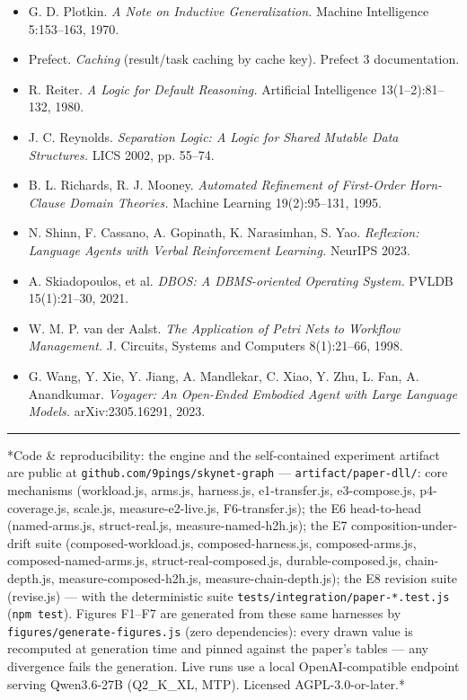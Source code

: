 \documentclass[11pt]{article}
\begin{document}
\begin{itemize}
\item G. D. Plotkin. \emph{A Note on Inductive Generalization.} Machine Intelligence 5:153–163, 1970.
\item Prefect. \emph{Caching} (result/task caching by cache key). Prefect 3 documentation.
\item R. Reiter. \emph{A Logic for Default Reasoning.} Artificial Intelligence 13(1–2):81–132, 1980.
\item J. C. Reynolds. \emph{Separation Logic: A Logic for Shared Mutable Data Structures.} LICS 2002, pp. 55–74.
\item B. L. Richards, R. J. Mooney. \emph{Automated Refinement of First-Order Horn-Clause Domain Theories.} Machine Learning 19(2):95–131, 1995.
\item N. Shinn, F. Cassano, A. Gopinath, K. Narasimhan, S. Yao. \emph{Reflexion: Language Agents with Verbal Reinforcement Learning.} NeurIPS 2023.
\item A. Skiadopoulos, et al. \emph{DBOS: A DBMS-oriented Operating System.} PVLDB 15(1):21–30, 2021.
\item W. M. P. van der Aalst. \emph{The Application of Petri Nets to Workflow Management.} J. Circuits, Systems and Computers 8(1):21–66, 1998.
\item G. Wang, Y. Xie, Y. Jiang, A. Mandlekar, C. Xiao, Y. Zhu, L. Fan, A. Anandkumar. \emph{Voyager: An Open-Ended Embodied Agent with Large Language Models.} arXiv:2305.16291, 2023.
\end{itemize}

\medskip\hrule\medskip

*Code \& reproducibility: the engine and the self-contained experiment artifact are public at \texttt{github.com/\allowbreak{}9pings/\allowbreak{}skynet-graph} — \texttt{artifact/\allowbreak{}paper-dll/\allowbreak{}}: core mechanisms (workload.js, arms.js, harness.js, e1-transfer.js, e3-compose.js, p4-coverage.js, scale.js, measure-e2-live.js, F6-transfer.js); the E6 head-to-head (named-arms.js, struct-real.js, measure-named-h2h.js); the E7 composition-under-drift suite (composed-workload.js, composed-harness.js, composed-arms.js, composed-named-arms.js, struct-real-composed.js, durable-composed.js, chain-depth.js, measure-composed-h2h.js, measure-chain-depth.js); the E8 revision suite (revise.js) — with the deterministic suite \texttt{tests/\allowbreak{}integration/\allowbreak{}paper-*.test.js} (\texttt{npm test}). Figures F1–F7 are generated from these same harnesses by \texttt{figures/\allowbreak{}generate-figures.js} (zero dependencies): every drawn value is recomputed at generation time and pinned against the paper's tables — any divergence fails the generation. Live runs use a local OpenAI-compatible endpoint serving Qwen3.6-27B (Q2\_K\_XL, MTP). Licensed AGPL-3.0-or-later.*
\end{document}
